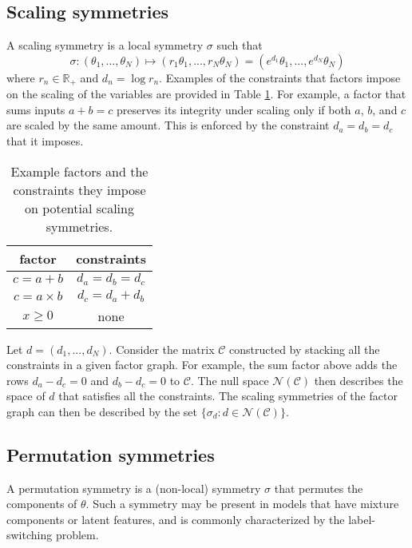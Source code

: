\subsection{Scaling symmetries} \label{sec:scaling}

A scaling symmetry is a local symmetry $\sigma$ such that
\[
\sigma: (\theta_1,...,\theta_N) \longmapsto (r_1\theta_1,...,r_N\theta_N) = (e^{d_1}\theta_1,...,e^{d_N}\theta_N)
\]
where $r_n\in\mathbb{R}_+$ and $d_n=\log r_n$. Examples of the constraints that factors impose on the scaling of the variables are provided in Table \ref{tab:scaling}. For example, a factor that sums inputs $a+b=c$ preserves its integrity under scaling only if both $a$, $b$, and $c$ are scaled by the same amount. This is enforced by the constraint $d_a=d_b=d_c$ that it imposes.

\begin{table}[b]
\centering
\begin{tabular}{|c|c|}
\hline
factor & constraints \\
\hline
$c=a+b$ & $d_a = d_b = d_c$ \\
$c = a\times b$ & $d_c= d_a + d_b$ \\
$x\geq0$ & none \\
\hline
\end{tabular}
\caption{Example factors and the constraints they impose on potential scaling symmetries.}
\label{tab:scaling}
\end{table}

Let $d=(d_1,...,d_N)$. Consider the matrix $\mathcal{C}$ constructed by stacking all the constraints in a given factor graph. For example, the sum factor above adds the rows $d_a-d_c=0$ and $d_b-d_c=0$ to $\mathcal{C}$. The null space $\mathcal{N}(\mathcal{C})$ then describes the space of $d$ that satisfies all the constraints. The scaling symmetries of the factor graph can then be described by the set $\{\sigma_d:d\in\mathcal{N}(\mathcal{C})\}$.


\subsection{Permutation symmetries} \label{sec:permutation}

A permutation symmetry is a (non-local) symmetry $\sigma$ that permutes the components of $\theta$. Such a symmetry may be present in models that have mixture components or latent features, and is commonly characterized by the label-switching problem.


